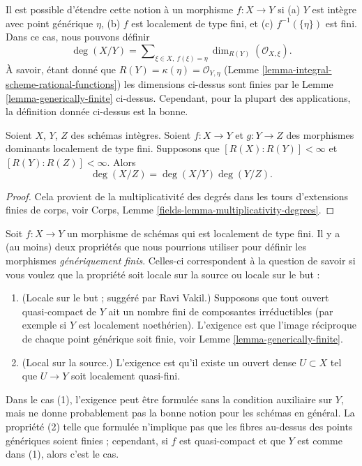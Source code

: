 \noindent
Il est possible d’étendre cette notion à un morphisme $f : X \to Y$
si (a) $Y$ est intègre avec point générique $\eta$,
(b) $f$ est localement de type fini, et (c) $f^{-1}(\{\eta\})$ est fini. Dans ce
cas, nous pouvons définir
$$
\deg(X/Y)
=
\sum\nolimits_{\xi \in X, \ f(\xi) = \eta}
\dim_{R(Y)} (\mathcal{O}_{X, \xi}).
$$
À savoir, étant donné que $R(Y) = \kappa(\eta) = \mathcal{O}_{Y, \eta}$ (Lemme \ref{lemma-integral-scheme-rational-functions})
les dimensions ci-dessus sont finies par
le Lemme \ref{lemma-generically-finite} ci-dessus.
Cependant, pour la plupart des
applications, la définition donnée ci-dessus est
la bonne.

\begin{lemma}
\label{lemma-degree-composition}
Soient $X$, $Y$, $Z$
des schémas intègres. Soient $f : X \to Y$ et $g : Y \to Z$ des morphismes
dominants localement de type fini. Supposons que $[R(X) : R(Y)] < \infty$
et $[R(Y) : R(Z)] < \infty$. Alors
$$
\deg(X/Z) = \deg(X/Y) \deg(Y/Z).
$$
\end{lemma}

\begin{proof}
Cela provient de la multiplicativité des degrés
dans les tours d'extensions
finies de corps, voir Corps, Lemme \ref{fields-lemma-multiplicativity-degrees}.
\end{proof}

\begin{remark}
\label{remark-definition-generically-finite}
Soit $f : X \to Y$ un morphisme de schémas qui est localement de type fini. Il y a (au moins) deux
propriétés que nous pourrions utiliser pour définir les morphismes {\it
génériquement finis}. Celles-ci correspondent à la question de savoir
si vous voulez que la propriété soit locale sur la source ou locale sur le but :
\begin{enumerate}
\item (Locale sur le but ; suggéré par Ravi Vakil.) Supposons
que tout ouvert quasi-compact de $Y$ ait un
nombre fini de composantes irréductibles (par exemple si $Y$ est localement
noethérien). L'exigence est que l'image réciproque de chaque point générique
soit finie, voir Lemme \ref{lemma-generically-finite}.
\item (Local sur la source.) L'exigence est qu'il existe un ouvert
dense $U \subset X$ tel que $U \to Y$ soit localement quasi-fini.
\end{enumerate}
Dans le cas (1), l'exigence peut être formulée sans la condition auxiliaire sur $Y$,
mais ne donne probablement pas la bonne notion pour les schémas en général.
La propriété (2) telle que formulée n'implique pas que les fibres au-dessus des points génériques
soient finies ; cependant, si $f$ est quasi-compact
et que $Y$ est comme dans (1), alors c'est le cas.
\end{remark}


